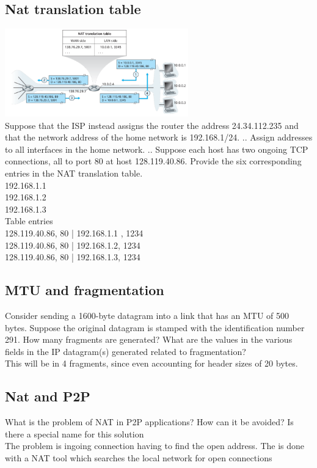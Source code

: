 \documentclass[12pt, a4paper]{article}
\begin{document}
		\subsection{Nat translation table}
			\includegraphics[width=300px]{assets/7.4.png}\\
			Suppose that the ISP instead assigns the router the address 24.34.112.235 and that the network address of the home network is 192.168.1/24. .. Assign addresses to all interfaces in the home network. .. Suppose each host has two ongoing TCP connections, all to port 80 at host 128.119.40.86. Provide the six corresponding entries in the NAT translation table.\\
			192.168.1.1\\
			192.168.1.2\\
			192.168.1.3\\
			Table entries\\
			128.119.40.86, 80 | 192.168.1.1 , 1234\\
			128.119.40.86, 80 | 192.168.1.2, 1234\\
			128.119.40.86, 80 | 192.168.1.3, 1234
		\subsection{MTU and fragmentation}
			Consider sending a 1600-byte datagram into a link that has an MTU of 500 bytes. Suppose the original datagram is stamped with the identification number 291. How many fragments are generated? What are the values in the various fields in the IP datagram(s) generated related to fragmentation?\\
			This will be in 4 fragments, since even accounting for header sizes of 20 bytes.
		\subsection{Nat and P2P}
			What is the problem of NAT in P2P applications? How can it be avoided? Is there a special name for this solution\\
			The problem is ingoing connection having to find the open address. The is done with a NAT tool which searches the local network for open connections
\end{document}
